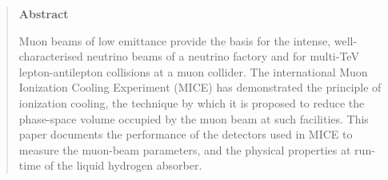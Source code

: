 \begin{quotation}
\begin{center}
\textbf{Abstract}
\end{center}

\noindent
Muon beams of low emittance provide the basis for the intense,
well-characterised neutrino beams of a neutrino factory and for
multi-TeV lepton-antilepton collisions at a muon collider.
The international Muon Ionization Cooling Experiment (MICE) has
demonstrated the principle of ionization cooling, the technique by
which it is proposed to reduce the phase-space volume occupied by the
muon beam at such facilities. 
This paper documents the performance of the detectors used in MICE
to measure the muon-beam parameters, and the physical properties at run-time of the liquid hydrogen absorber.

\end{quotation}
